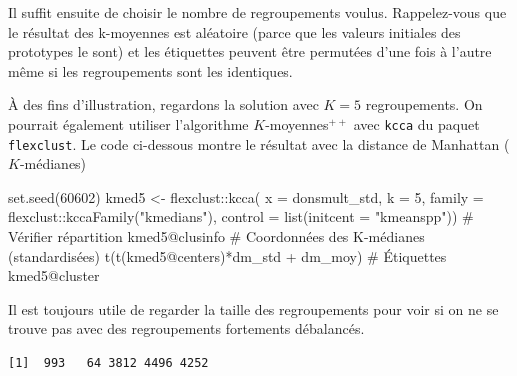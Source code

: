 \documentclass[
  11pt,
  letterpaper,
]{scrbook}
\newenvironment{Shaded}{\begin{snugshade}}{\end{snugshade}}
\newcommand{\AttributeTok}[1]{\textcolor[rgb]{0.40,0.45,0.13}{#1}}
\newcommand{\CommentTok}[1]{\textcolor[rgb]{0.37,0.37,0.37}{#1}}
\newcommand{\DecValTok}[1]{\textcolor[rgb]{0.68,0.00,0.00}{#1}}
\newcommand{\FunctionTok}[1]{\textcolor[rgb]{0.28,0.35,0.67}{#1}}
\newcommand{\NormalTok}[1]{\textcolor[rgb]{0.00,0.23,0.31}{#1}}
\newcommand{\OtherTok}[1]{\textcolor[rgb]{0.00,0.23,0.31}{#1}}
\newcommand{\SpecialCharTok}[1]{\textcolor[rgb]{0.37,0.37,0.37}{#1}}
\newcommand{\StringTok}[1]{\textcolor[rgb]{0.13,0.47,0.30}{#1}}
\theoremstyle{definition}
\theoremstyle{remark}
\begin{document}
Il suffit ensuite de choisir le nombre de regroupements voulus.
Rappelez-vous que le résultat des k-moyennes est aléatoire (parce que
les valeurs initiales des prototypes le sont) et les étiquettes peuvent
être permutées d'une fois à l'autre même si les regroupements sont les
identiques.

À des fins d'illustration, regardons la solution avec \(K=5\)
regroupements. On pourrait également utiliser l'algorithme
\(K\)-moyennes\({}^{++}\) avec \texttt{kcca} du paquet
\texttt{flexclust}. Le code ci-dessous montre le résultat avec la
distance de Manhattan (\(K\)-médianes)

\begin{Shaded}
\begin{Highlighting}[]
\FunctionTok{set.seed}\NormalTok{(}\DecValTok{60602}\NormalTok{)}
\NormalTok{kmed5 }\OtherTok{\textless{}{-}}\NormalTok{ flexclust}\SpecialCharTok{::}\FunctionTok{kcca}\NormalTok{(}
  \AttributeTok{x =}\NormalTok{ donsmult\_std,}
  \AttributeTok{k =} \DecValTok{5}\NormalTok{,}
  \AttributeTok{family =}\NormalTok{ flexclust}\SpecialCharTok{::}\FunctionTok{kccaFamily}\NormalTok{(}\StringTok{"kmedians"}\NormalTok{),}
  \AttributeTok{control =} \FunctionTok{list}\NormalTok{(}\AttributeTok{initcent =} \StringTok{"kmeanspp"}\NormalTok{))}
\CommentTok{\# Vérifier répartition}
\NormalTok{kmed5}\SpecialCharTok{@}\NormalTok{clusinfo}
\CommentTok{\# Coordonnées des K{-}médianes (standardisées)}
\FunctionTok{t}\NormalTok{(}\FunctionTok{t}\NormalTok{(kmed5}\SpecialCharTok{@}\NormalTok{centers)}\SpecialCharTok{*}\NormalTok{dm\_std }\SpecialCharTok{+}\NormalTok{ dm\_moy)}
\CommentTok{\# Étiquettes}
\NormalTok{kmed5}\SpecialCharTok{@}\NormalTok{cluster}
\end{Highlighting}
\end{Shaded}

Il est toujours utile de regarder la taille des regroupements pour voir
si on ne se trouve pas avec des regroupements fortements débalancés.

\begin{Shaded}
\end{Shaded}

\begin{verbatim}
[1]  993   64 3812 4496 4252
\end{verbatim}
\end{document}
